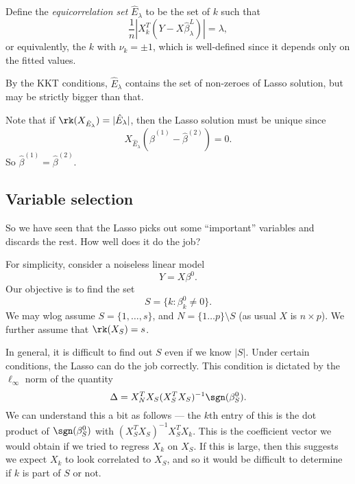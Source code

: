 \documentclass[a4paper]{article}
\begin{document}
\begin{defi}
  Define the \emph{equicorrelation set} $\hat{E}_\lambda$ to be the set of $k$ such that
  \[
    \frac{1}{n} |X_k^T(Y - X \hat{\beta}_\lambda^L)| = \lambda,
  \]
  or equivalently, the $k$ with $\nu_k = \pm 1$, which is well-defined since it depends only on the fitted values.
\end{defi}
By the KKT conditions, $\hat{E}_\lambda$ contains the set of non-zeroes of Lasso solution, but may be strictly bigger than that.

Note that if $\rk(X_{\hat{E}_\lambda}) = |\hat{E}_\lambda|$, then the Lasso solution must be unique since
\[
  X_{\hat{E}_\lambda} (\hat{\beta}^{(1)} - \hat{\beta}^{(2)}) = 0.
\]
So $\hat{\beta}^{(1)} = \hat{\beta}^{(2)}$.

\subsection{Variable selection}
So we have seen that the Lasso picks out some ``important'' variables and discards the rest. How well does it do the job?

For simplicity, consider a noiseless linear model
\[
  Y = X \beta^0.
\]
Our objective is to find the set
\[
  S = \{k: \beta_k^0 \not= 0\}.
\]
We may wlog assume $S = \{1, \ldots, s\}$, and $N = \{1 \ldots p\} \setminus S$ (as usual $X$ is $n \times p$). We further assume that $\rk (X_S) = s$.

In general, it is difficult to find out $S$ even if we know $|S|$. Under certain conditions, the Lasso can do the job correctly. This condition is dictated by the $\ell_\infty$ norm of the quantity
\[
  \Delta = X_N^T X_S (X_S^T X_S)^{-1} \sgn (\beta^0_S).
\]
We can understand this a bit as follows --- the $k$th entry of this is the dot product of $\sgn (\beta^0_S)$ with $(X_S^T X_S)^{-1} X_S^T X_k$. This is the coefficient vector we would obtain if we tried to regress $X_k$ on $X_S$. If this is large, then this suggests we expect $X_k$ to look correlated to $X_S$, and so it would be difficult to determine if $k$ is part of $S$ or not.
\end{document}
